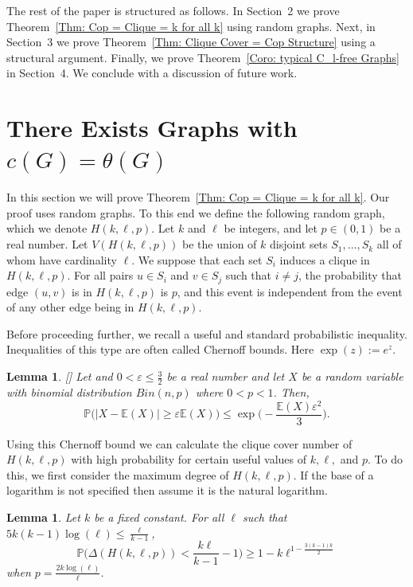 \documentclass[12pt]{amsart}
\newtheorem{lemma}[theorem]{Lemma}
\theoremstyle{definition}
\def\epsilon{\varepsilon}
\begin{document}
The rest of the paper is structured as follows.
In Section~2 we prove Theorem~\ref{Thm: Cop = Clique = k for all k} using random graphs.
Next, in Section~3 we prove Theorem~\ref{Thm: Clique Cover = Cop Structure} using a structural argument.
Finally, we prove Theorem~\ref{Coro: typical C_l-free Graphs} in Section~4.
We conclude with a discussion of future work.




\section{There Exists Graphs with $c(G) = \theta(G)$}

In this section we will prove Theorem~\ref{Thm: Cop = Clique = k for all k}.
Our proof uses random graphs.
To this end we define the following random graph, which we denote $H(k,\ell,p)$.
Let $k$ and $\ell$ be integers, and let $p \in (0,1)$ be a real number.
Let $V(H(k,\ell,p))$ be the union of $k$ disjoint sets $S_1,\dots, S_k$ all of whom have cardinality $\ell$.
We suppose that each set $S_i$ induces a clique in $H(k,\ell,p)$.
For all pairs $u \in S_i$ and $v\in S_j$ such that $i\neq j$, 
the probability that edge $(u,v)$ is in $H(k,\ell,p)$ is $p$, and this event is independent from the event of any other edge being in $H(k,\ell,p)$.

Before proceeding further, we recall a useful and standard probabilistic inequality.
Inequalities of this type are often called Chernoff bounds.
Here $\exp(z) := e^z$.

\begin{lemma}\label{Lemma: Chernoff's Bound}\emph{[\cite{janson2011random}]}
    Let and $0 < \epsilon \leq \frac{3}{2}$ be a real number and let $X$ be a random variable with binomial distribution $Bin(n,p)$ where $0<p<1$. Then, 
    \[
    \mathbb{P}\Big(|X - \mathbb{E}(X)| \geq \epsilon\mathbb{E}(X)\Big) \leq \exp\Bigg(-\frac{\mathbb{E}(X)\epsilon^2}{3}\Bigg).
    \]
\end{lemma}

Using this Chernoff bound we can calculate the clique cover number of $H(k,\ell,p)$ with high probability
for certain useful values of $k,\ell,$ and $p$.
To do this, we first consider the maximum degree of $H(k,\ell,p)$.
If the base of a logarithm is not specified then assume it is the natural logarithm.


\begin{lemma}\label{Lemma: Max-degree random}
    Let $k$ be a fixed constant.
    For all $\ell$ such that $5k(k-1)\log(\ell) \leq \frac{\ell}{k-1}$,
    \[
    \mathbb{P}\Bigg(\Delta(H(k,\ell,p)) < \frac{k\ell}{k-1} - 1 \Bigg) \geq 1 - k\ell^{1-\frac{3(k-1)k}{2}}
    \]
    when $p = \frac{2k\log(\ell)}{\ell}$.
\end{lemma}
\end{document}
